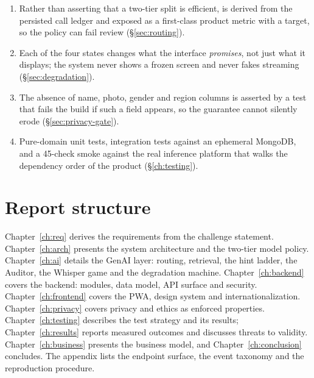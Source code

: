 \begin{enumerate}[leftmargin=1.6em,itemsep=2pt]
  \item {} Rather than asserting that a two-tier split is
        efficient,  is derived from the persisted call ledger and exposed
        as a first-class product metric with a target, so the policy can fail review
        (\S\ref{sec:routing}).
  \item {} Each of the four states changes what
        the interface \emph{promises}, not just what it displays; the system never
        shows a frozen screen and never fakes streaming
        (\S\ref{sec:degradation}).
  \item {} The absence of name, photo, gender and region
        columns is asserted by a test that fails the build if such a field appears, so
        the guarantee cannot silently erode (\S\ref{sec:privacy-gate}).
  \item {} Pure-domain unit tests,
        integration tests against an ephemeral MongoDB, and a 45-check smoke against the
        real inference platform that walks the dependency order of the product
        (\S\ref{ch:testing}).
\end{enumerate}

\section{Report structure}

Chapter~\ref{ch:req} derives the requirements from the challenge statement.
Chapter~\ref{ch:arch} presents the system architecture and the two-tier model policy.
Chapter~\ref{ch:ai} details the GenAI layer: routing, retrieval, the hint ladder, the
Auditor, the Whisper game and the degradation machine.
Chapter~\ref{ch:backend} covers the backend: modules, data model, API surface and
security. Chapter~\ref{ch:frontend} covers the PWA, design system and internationalization.
Chapter~\ref{ch:privacy} covers privacy and ethics as enforced properties.
Chapter~\ref{ch:testing} describes the test strategy and its results;
Chapter~\ref{ch:results} reports measured outcomes and discusses threats to validity.
Chapter~\ref{ch:business} presents the business model, and Chapter~\ref{ch:conclusion}
concludes. The appendix lists the endpoint surface, the event taxonomy and the
reproduction procedure.
